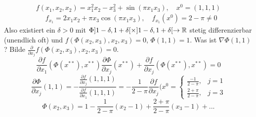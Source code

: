 \begin{beispiel*}
	\[ f(x_1,x_2,x_2)=x_1^2x_2-x_3^2+\sin(\pi x_1x_3),\quad x^0=(1,1,1)  \]
	\begin{align*}
	&f_{x_1}=2x_1x_2+\pi x_3\cos(\pi x_1x_3),\quad f_{x_1}(x^0)=2-\pi\neq 0
	\end{align*}
	Also existiert ein $ \delta>0 $ mit $ \Phi]1-\delta,1+\delta[\times]1-\delta,1+\delta[\rightarrow\mathbb{R} $ stetig differenzierbar (unendlich oft) und $ f(\Phi(x_2,x_3),x_2,x_3)=0 $, $ \Phi(1,1)=1 $. Was ist $ \nabla\Phi(1,1) $? Bilde $ \frac{\partial}{\partial x_j}f(\Phi(x_2,x_3),x_2,x_3)=0 $.
	\[ \frac{\partial f}{\partial x_1}(\Phi(x^{\ast\ast}),x^{\ast\ast})\frac{\partial\Phi}{\partial x_j}(x^{\ast\ast})+\frac{\partial f}{\partial x_j}(\Phi(x^{\ast\ast}),x^{\ast\ast})=0 \]
	\[ \frac{\partial\Phi}{\partial x_j}(1,1)=-\frac{\frac{\partial f}{\partial x_j}(1,1,1)}{\frac{\partial f}{\partial x_1}(1,1,1)}=-\frac{1}{2-\pi}\frac{\partial f}{\partial x_j}(x^{0}= \begin{cases}
	\frac{-1}{2-\pi},&j=1\\\frac{2+\pi}{2-\pi},&j=3
	\end{cases} \]
	\[ \Phi(x_2,x_3)=1-\frac{1}{2-\pi}(x_2-1)+\frac{2+\pi}{2-\pi}(x_3-1)+... \]
\end{beispiel*}
%
%
%
%
%
%
%
%

